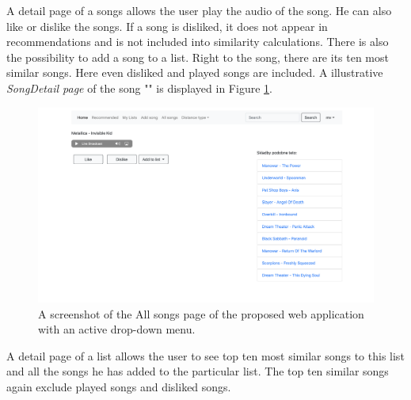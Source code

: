 A detail page of a songs allows the user play the audio of the song. He can also like or dislike the songs. If a song is disliked, it does not appear in recommendations and is not included into similarity calculations. There is also the possibility to add a song to a list.
Right to the song, there are its ten most similar songs. Here even disliked and played songs are included. A illustrative \textit{SongDetail page} of the song "" is displayed in Figure \ref{fig:song_detail_page}. \\
\begin{figure}[H]
    \centering
	\includegraphics[width=1\linewidth]{./img/song_detail_page.png}
	\caption{A screenshot of the All songs page of the proposed web application with an active drop-down menu.}
	\label{fig:song_detail_page}
\end{figure}
A detail page of a list allows the user to see top ten most similar songs to this list and all the songs he has added to the particular list. The top ten similar songs again exclude played songs and disliked songs. \\




